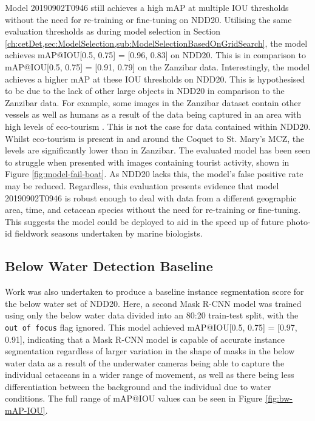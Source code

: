 Model 20190902T0946 still achieves a high mAP at multiple IOU thresholds without the need for re-training or fine-tuning on NDD20. Utilising the same evaluation thresholds as during model selection in Section \ref{ch:cetDet,sec:ModelSelection,sub:ModelSelectionBasedOnGridSearch}, the model achieves mAP@IOU[0.5, 0.75] = [0.96, 0.83] on NDD20. This is in comparison to mAP@IOU[0.5, 0.75] = [0.91, 0.79] on the Zanzibar data. Interestingly, the model achieves a higher mAP at these IOU thresholds on NDD20. This is hypothesised to be due to the lack of other large objects in NDD20 in comparison to the Zanzibar data. For example, some images in the Zanzibar dataset contain other vessels as well as humans as a result of the data being captured in an area with high levels of eco-tourism \cite{christiansen_effects_2010}. This is not the case for data contained within NDD20. Whilst eco-tourism is present in and around the Coquet to St. Mary's MCZ, the levels are significantly lower than in Zanzibar. The evaluated model has been seen to struggle when presented with images containing tourist activity, shown in Figure \ref{fig:model-fail-boat}. As NDD20 lacks this, the model's false positive rate may be reduced. Regardless, this evaluation presents evidence that model 20190902T0946 is robust enough to deal with data from a different geographic area, time, and cetacean species without the need for re-training or fine-tuning. This suggests the model could be deployed to aid in the speed up of future photo-id fieldwork seasons undertaken by marine biologists. 

\subsection{Below Water Detection Baseline}\label{ch:NDD,sec:EvalUsingNDD20,subsec:belowWaterDetectionBasleine}

Work was also undertaken to produce a baseline instance segmentation score for the below water set of NDD20. Here, a second Mask R-CNN model was trained using only the below water data divided into an 80:20 train-test split, with the \texttt{out of focus} flag ignored. This model achieved mAP@IOU[0.5, 0.75] = [0.97, 0.91], indicating that a Mask R-CNN model is capable of accurate instance segmentation regardless of larger variation in the shape of masks in the below water data as a result of the underwater cameras being able to capture the individual cetaceans in a wider range of movement, as well as there being less differentiation between the background and the individual due to water conditions. The full range of mAP@IOU values can be seen in Figure \ref{fig:bw-mAP-IOU}.


